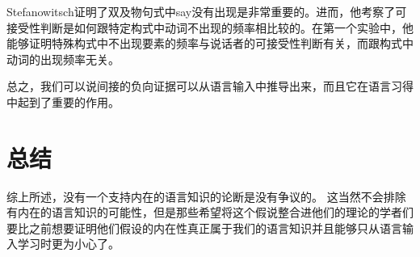 Stefanowitsch证明了双及物句式中say没有出现是非常重要的。进而，他考察了可接受性判断是如何跟特定构式中动词不出现的频率相比较的。在第一个实验中，他能够证明特殊构式中不出现要素的频率与说话者的可接受性判断有关，而跟构式中动词的出现频率无关。

总之，我们可以说间接的负向证据可以从语言输入中推导出来，而且它在语言习得中起到了重要的作用。
% 

\section{总结}

综上所述，没有一个支持内在的语言知识的论断是没有争议的。
这当然不会排除有内在的语言知识的可能性，但是那些希望将这个假说整合进他们的理论的学者们要比之前想要证明他们假设的内在性真正属于我们的语言知识并且能够只从语言输入学习时更为小心了。
%



